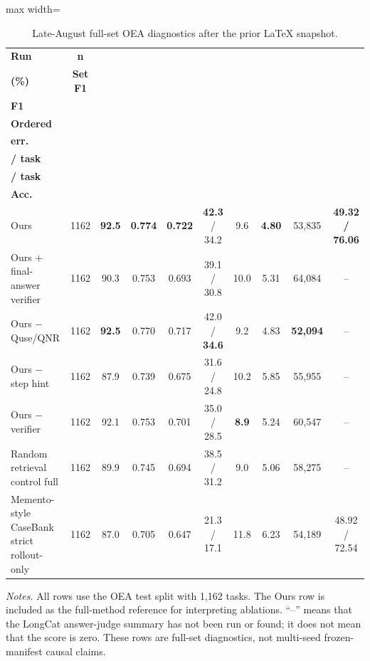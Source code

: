 \documentclass[11pt]{article}
\begin{document}
\begin{table}[h]
\centering
\caption{Late-August full-set OEA diagnostics after the prior LaTeX snapshot.}
\scriptsize
\setlength{\tabcolsep}{2.1pt}
\renewcommand{\arraystretch}{1.12}
\begin{adjustbox}{max width=\textwidth}
\begin{tabular}{lccccccccc}
\toprule
\textbf{Run} &
\textbf{n} &
\makecell{\textbf{Success}\\\textbf{(\%)}} &
\textbf{Set F1} &
\makecell{\textbf{Multi.}\\\textbf{F1}} &
\makecell{\textbf{Exact /}\\\textbf{Ordered}} &
\makecell{\textbf{Tool}\\\textbf{err.}} &
\makecell{\textbf{Tools}\\\textbf{/ task}} &
\makecell{\textbf{Tokens}\\\textbf{/ task}} &
\makecell{\textbf{Answer / Gen.}\\\textbf{Acc.}} \\
\midrule
Ours & 1162 & \textbf{92.5} & \textbf{0.774} & \textbf{0.722} & \textbf{42.3} / 34.2 & 9.6 & \textbf{4.80} & 53,835 & \textbf{49.32 / 76.06} \\
Ours + final-answer verifier & 1162 & 90.3 & 0.753 & 0.693 & 39.1 / 30.8 & 10.0 & 5.31 & 64,084 & -- \\
Ours $-$ Quse/QNR & 1162 & \textbf{92.5} & 0.770 & 0.717 & 42.0 / \textbf{34.6} & 9.2 & 4.83 & \textbf{52,094} & -- \\
Ours $-$ step hint & 1162 & 87.9 & 0.739 & 0.675 & 31.6 / 24.8 & 10.2 & 5.85 & 55,955 & -- \\
Ours $-$ verifier & 1162 & 92.1 & 0.753 & 0.701 & 35.0 / 28.5 & \textbf{8.9} & 5.24 & 60,547 & -- \\
Random retrieval control full & 1162 & 89.9 & 0.745 & 0.694 & 38.5 / 31.2 & 9.0 & 5.06 & 58,275 & -- \\
Memento-style CaseBank strict rollout-only & 1162 & 87.0 & 0.705 & 0.647 & 21.3 / 17.1 & 11.8 & 6.23 & 54,189 & 48.92 / 72.54 \\
\bottomrule
\end{tabular}
\end{adjustbox}
\vspace{2pt}
\footnotesize
\textit{Notes.} All rows use the OEA test split with 1,162 tasks. The Ours row is included as the full-method reference for interpreting ablations. ``--'' means that the LongCat answer-judge summary has not been run or found; it does not mean that the score is zero. These rows are full-set diagnostics, not multi-seed frozen-manifest causal claims.
\end{table}
\end{document}
